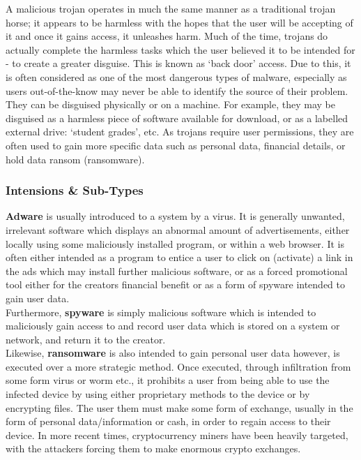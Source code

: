 \documentclass[11pt, english]{article}
\begin{document}
	A malicious trojan operates in much the same manner as a traditional trojan horse; it appears to be harmless with the hopes that the user will be accepting of it and once it gains access, it unleashes harm. Much of the time, trojans do actually complete the harmless tasks which the user believed it to be intended for - to create a greater disguise. This is known as `back door' access. Due to this, it is often considered as one of the most dangerous types of malware, especially as users out-of-the-know may never be able to identify the source of their problem. They can be disguised physically or on a machine. For example, they may be disguised as a harmless piece of software available for download, or as a labelled external drive: `student grades', etc. As trojans require user permissions, they are often used to gain more specific data such as personal data, financial details, or hold data ransom (ransomware).

		\subsubsection{Intensions \& Sub-Types}

	\textbf{Adware} is usually introduced to a system by a virus. It is generally unwanted, irrelevant software which displays an abnormal amount of advertisements, either locally using some maliciously installed program, or within a web browser. It is often either intended as a program to entice a user to click on (activate) a link in the ads which may install further malicious software, or as a forced promotional tool either for the creators financial benefit or as a form of spyware intended to gain user data.\\

	Furthermore, \textbf{spyware} is simply malicious software which is intended to maliciously gain access to and record user data which is stored on a system or network, and return it to the creator.\\

	Likewise, \textbf{ransomware} is also intended to gain personal user data however, is executed over a more strategic method. Once executed, through infiltration from some form virus or worm etc., it prohibits a user from being able to use the infected device by using either proprietary methods to the device or by encrypting files. The user them must make some form of exchange, usually in the form of personal data/information or cash, in order to regain access to their device. In more recent times, cryptocurrency miners have been heavily targeted, with the attackers forcing them to make enormous crypto exchanges.\\
\end{document}
